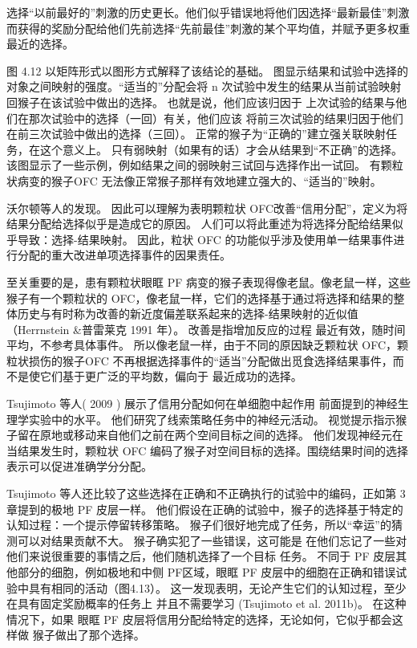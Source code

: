 选择“以前最好的”刺激的历史更长。他们似乎错误地将他们因选择“最新最佳”刺激而获得的奖励分配给他们先前选择“先前最佳”刺激的某个平均值，并赋予更多权重最近的选择。\par
图 4.12 以矩阵形式以图形方式解释了该结论的基础。 图显示结果和试验中选择的对象之间映射的强度。“适当的”分配会将 n 次试验中发生的结果从当前试验映射回猴子在该试验中做出的选择。 也就是说，他们应该归因于
上次试验的结果与他们在那次试验中的选择（一回）有关，他们应该
将前三次试验的结果归因于他们在前三次试验中做出的选择（三回）。 正常的猴子为“正确的”建立强关联映射任务，在这个意义上。 只有弱映射（如果有的话）才会从结果到“不正确”的选择。 该图显示了一些示例，例如结果之间的弱映射三试回与选择作出一试回。 有颗粒状病变的猴子OFC 无法像正常猴子那样有效地建立强大的、“适当的”映射。\par
沃尔顿等人的发现。 因此可以理解为表明颗粒状 OFC改善“信用分配”，定义为将结果分配给选择似乎是造成它的原因。 人们可以将此重述为将选择分配给结果似乎导致：选择-结果映射。 因此，粒状 OFC 的功能似乎涉及使用单一结果事件进行分配的重大改进单项选择事件的因果责任。\par
至关重要的是，患有颗粒状眼眶 PF 病变的猴子表现得像老鼠。像老鼠一样，这些猴子有一个颗粒状的 OFC，像老鼠一样，它们的选择基于通过将选择和结果的整体历史与有时称为改善的新近度偏差联系起来的选择-结果映射的近似值（Herrnstein \&普雷莱克 1991 年）。 改善是指增加反应的过程
最近有效，随时间平均，不参考具体事件。 所以像老鼠一样，由于不同的原因缺乏颗粒状 OFC，颗粒状损伤的猴子OFC 不再根据选择事件的“适当”分配做出觅食选择结果事件，而不是使它们基于更广泛的平均数，偏向于
最近成功的选择。\par
Tsujimoto 等人( 2009 ) 展示了信用分配如何在单细胞中起作用
前面提到的神经生理学实验中的水平。 他们研究了线索策略任务中的神经元活动。 视觉提示指示猴子留在原地或移动来自他们之前在两个空间目标之间的选择。 他们发现神经元在当结果发生时，颗粒状 OFC 编码了猴子对空间目标的选择。围绕结果时间的选择表示可以促进准确学分分配。\par
Tsujimoto 等人还比较了这些选择在正确和不正确执行的试验中的编码，正如第 3 章提到的极地 PF 皮层一样。 他们假设在正确的试验中，猴子的选择基于特定的认知过程：一个提示停留转移策略。 猴子们很好地完成了任务，所以“幸运”的猜测可以对结果贡献不大。 猴子确实犯了一些错误，这可能是
在他们忘记了一些对他们来说很重要的事情之后，他们随机选择了一个目标
任务。 不同于 PF 皮层其他部分的细胞，例如极地和中侧 PF区域，眼眶 PF 皮层中的细胞在正确和错误试验中具有相同的活动（图4.13）。 这一发现表明，无论产生它们的认知过程，至少在具有固定奖励概率的任务上
并且不需要学习 (Tsujimoto et al. 2011b)。 在这种情况下，如果
眼眶 PF 皮层将信用分配给特定的选择，无论如何，它似乎都会这样做
猴子做出了那个选择。\par
